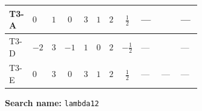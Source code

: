 \documentclass[8pt]{article}
\begin{document}
\begin{landscape}
\begin{longtable}{@{}llcccccc >{\raggedright\arraybackslash}p{0.21\linewidth} >{\raggedright\arraybackslash}p{0.21\linewidth} >{\raggedright\arraybackslash}p{0.21\linewidth}@{}}
\midrule
T3-A & $0$ & $1$ & $0$ & $3$ & $1$ & $2$ & $\frac{1}{2}$ & --- & \scriptsize\adjustbox{max width=\linewidth}{$\begin{gathered} 4 {\lambda_{T3}} \left({\lambda_{T3}}\right)^{*}\end{gathered}$} & --- \\
\midrule
T3-D & $-2$ & $3$ & $-1$ & $1$ & $0$ & $2$ & $-\frac{1}{2}$ & --- & \scriptsize\adjustbox{max width=\linewidth}{$\begin{gathered} 4 {\lambda_{T3}} \left({\lambda_{T3}}\right)^{*}\end{gathered}$} & --- \\
\midrule
T3-E & $0$ & $3$ & $0$ & $3$ & $1$ & $2$ & $\frac{1}{2}$ & --- & --- & --- \\
\midrule
\bottomrule
\end{longtable}
\clearpage
\noindent\textbf{Search name: }\texttt{lambda12}\par\smallskip

\end{landscape}
\end{document}

